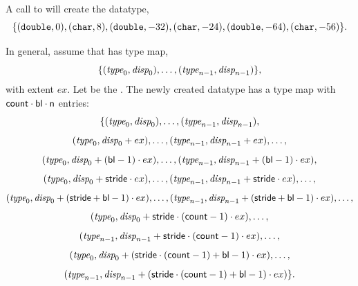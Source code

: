 \begin{example}
\label{pt2pt-exTTT}
%
%
A call to  will create
the datatype,
\begin{displaymath}
\{
(\ctype{double}, 0), (\ctype{char}, 8), (\ctype{double}, -32), (\ctype{char},
-24), (\ctype{double}, -64), (\ctype{char}, -56)
\} .
\end{displaymath}
\end{example}

In general, assume that  has type map,
\begin{displaymath}
\{ (\textrm{\itshape{type}}_0,\textrm{\itshape{disp}}_0), \ldots, (\textrm{\itshape{type}}_{n-1}, \textrm{\itshape{disp}}_{n-1}) \} ,
\end{displaymath}
with extent $ex$.  Let  be the .
The newly created  datatype has a type map with
$\textsf{count} \cdot \textsf{bl} \cdot \textsf{n}$
entries:
\begin{displaymath}
\{
(\textrm{\itshape{type}}_0, \textrm{\itshape{disp}}_0), \ldots , (\textrm{\itshape{type}}_{n-1} , \textrm{\itshape{disp}}_{n-1}),
\end{displaymath}
\begin{displaymath}
(\textrm{\itshape{type}}_0 ,\textrm{\itshape{disp}}_0 + ex) , \ldots ,
(\textrm{\itshape{type}}_{n-1} , \textrm{\itshape{disp}}_{n-1} + ex ), \ldots,
\end{displaymath}
\begin{displaymath}
(\textrm{\itshape{type}}_0 , \textrm{\itshape{disp}}_0 + (\textsf{bl} -1) \cdot ex
) , \ldots , (\textrm{\itshape{type}}_{n-1} , \textrm{\itshape{disp}}_{n-1} + (\textsf{bl} -1) \cdot ex ) ,
\end{displaymath}
\begin{displaymath}
(\textrm{\itshape{type}}_0 ,\textrm{\itshape{disp}}_0 + \textsf{stride} \cdot ex ) , \ldots ,
(\textrm{\itshape{type}}_{n-1} , \textrm{\itshape{disp}}_{n-1} + \textsf{stride} \cdot ex ), \ldots ,
\end{displaymath}
\begin{displaymath}
(\textrm{\itshape{type}}_0 , \textrm{\itshape{disp}}_0 + (\textsf{stride} + \textsf{bl} -1) \cdot ex ) , \ldots ,
(\textrm{\itshape{type}}_{n-1}, \textrm{\itshape{disp}}_{n-1} + (\textsf{stride} + \textsf{bl} -1) \cdot
ex ) , \ldots ,
\end{displaymath}
\begin{displaymath}
(\textrm{\itshape{type}}_0 ,\textrm{\itshape{disp}}_0 + \textsf{stride} \cdot (\textsf{count}-1) \cdot ex ) , \ldots ,
\end{displaymath}
\begin{displaymath}
(\textrm{\itshape{type}}_{n-1} , \textrm{\itshape{disp}}_{n-1} + \textsf{stride} \cdot (\textsf{count} -1) \cdot
ex )
, \ldots ,
\end{displaymath}
\begin{displaymath}
(\textrm{\itshape{type}}_0 , \textrm{\itshape{disp}}_0 + (\textsf{stride} \cdot (\textsf{count} -1)
+ \textsf{bl} -1) \cdot ex ) , \ldots ,
\end{displaymath}
\begin{displaymath}
(\textrm{\itshape{type}}_{n-1}, \textrm{\itshape{disp}}_{n-1} + (\textsf{stride} \cdot (\textsf{count} -1)
+ \textsf{bl} -1) \cdot ex )
\} .
\end{displaymath}


